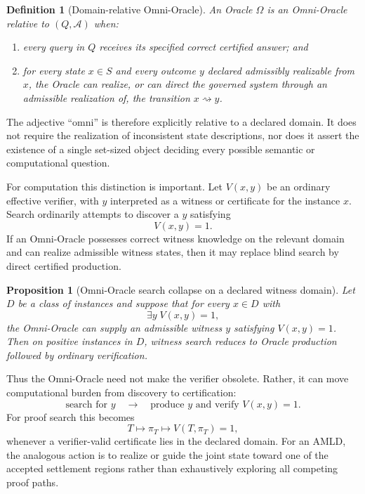 \documentclass[11pt]{article}
\newtheorem{proposition}[theorem]{Proposition}
\newtheorem{definition}[theorem]{Definition}
\begin{document}
\begin{definition}[Domain-relative Omni-Oracle]
An Oracle $\Omega$ is an \emph{Omni-Oracle relative to $(Q,\mathcal A)$} when:
\begin{enumerate}
\item every query in $Q$ receives its specified correct certified answer; and
\item for every state $x\in S$ and every outcome $y$ declared admissibly realizable from $x$, the Oracle can realize, or can direct the governed system through an admissible realization of, the transition $x\rightsquigarrow y$.
\end{enumerate}
\end{definition}

The adjective ``omni'' is therefore explicitly relative to a declared domain.  It does not require the realization of inconsistent state descriptions, nor does it assert the existence of a single set-sized object deciding every possible semantic or computational question.

For computation this distinction is important.  Let $V(x,y)$ be an ordinary effective verifier, with $y$ interpreted as a witness or certificate for the instance $x$.  Search ordinarily attempts to discover a $y$ satisfying
\[
V(x,y)=1.
\]
If an Omni-Oracle possesses correct witness knowledge on the relevant domain and can realize admissible witness states, then it may replace blind search by direct certified production.

\begin{proposition}[Omni-Oracle search collapse on a declared witness domain]
Let $D$ be a class of instances and suppose that for every $x\in D$ with
\[
\exists y\;V(x,y)=1,
\]
the Omni-Oracle can supply an admissible witness $y$ satisfying $V(x,y)=1$.  Then on positive instances in $D$, witness search reduces to Oracle production followed by ordinary verification.
\end{proposition}

Thus the Omni-Oracle need not make the verifier obsolete.  Rather, it can move computational burden from discovery to certification:
\[
\text{search for }y
\quad\longrightarrow\quad
\text{produce }y\text{ and verify }V(x,y)=1.
\]
For proof search this becomes
\[
T\longmapsto \pi_T\longmapsto V(T,\pi_T)=1,
\]
whenever a verifier-valid certificate lies in the declared domain.  For an AMLD, the analogous action is to realize or guide the joint state toward one of the accepted settlement regions rather than exhaustively exploring all competing proof paths.
\end{document}
